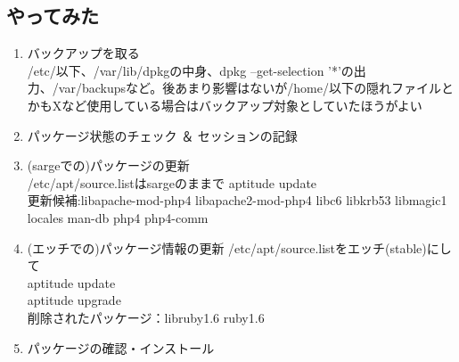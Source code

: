 \documentclass[mingoth,a4paper]{jsarticle}
\begin{document}
\subsection{やってみた}
\begin{enumerate}
\item バックアップを取る\\
/etc/以下、/var/lib/dpkgの中身、dpkg --get-selection '*'の出力、/var/backupsなど。後あまり影響はないが/home/以下の隠れファイルとかもXなど使用している場合はバックアップ対象としていたほうがよい
\item パッケージ状態のチェック ＆ セッションの記録
\item (sargeでの)パッケージの更新 \\
/etc/apt/source.listはsargeのままで aptitude update\\
更新候補:libapache-mod-php4 libapache2-mod-php4 libc6 libkrb53 libmagic1 locales man-db php4 php4-comm
\item (エッチでの)パッケージ情報の更新
/etc/apt/source.listをエッチ(stable)にして\\
aptitude update\\
aptitude upgrade\\
削除されたパッケージ：libruby1.6 ruby1.6
\item パッケージの確認・インストール


\end{enumerate}
\end{document}
